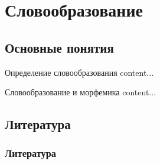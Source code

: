 \section{Словообразование}

\subsection{Основные понятия}


\begin{frame}{Определение словообразования}
    content...
\end{frame}

\begin{frame}{Словообразование и морфемика}
    content...
\end{frame}


\subsection{Литература}


\begin{frame}
    \frametitle{Литература}
\end{frame}
